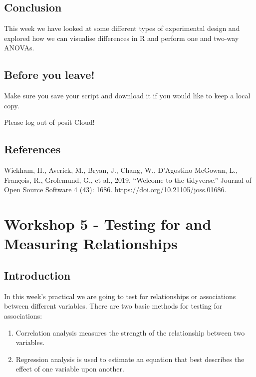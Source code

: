 \documentclass[
]{book}
\providecommand{\tightlist}{%
  \setlength{\itemsep}{0pt}\setlength{\parskip}{0pt}}
\begin{document}
\section{Conclusion}\label{conclusion-3}

This week we have looked at some different types of experimental design and explored how we can visualise differences in R and perform one and two-way ANOVAs.

\section{Before you leave!}\label{before-you-leave-3}

Make sure you save your script and download it if you would like to keep a local copy.

Please log out of posit Cloud!

\section{References}\label{references-3}

Wickham, H., Averick, M., Bryan, J., Chang, W., D'Agostino McGowan, L., François, R., Grolemund, G., et al., 2019. ``Welcome to the tidyverse.'' Journal of Open Source Software 4 (43): 1686. \url{https://doi.org/10.21105/joss.01686}.

\chapter{Workshop 5 - Testing for and Measuring Relationships}\label{workshop-5---testing-for-and-measuring-relationships}

\section{Introduction}\label{introduction-4}

In this week's practical we are going to test for relationships or associations between different variables. There are two basic methods for testing for associations:

\begin{enumerate}
\def\labelenumi{\arabic{enumi})}
\tightlist
\item
  Correlation analysis measures the strength of the relationship between two variables.
\item
  Regression analysis is used to estimate an equation that best describes the effect of one variable upon another.
\end{enumerate}
\end{document}
